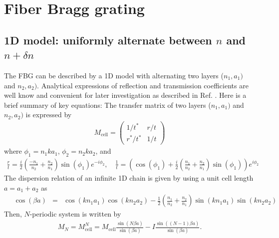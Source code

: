 \documentclass[aps,pra, onecolumn,superscriptaddress,nopacs,floatfix, showkeys, notitlepage]{revtex4-1}
\begin{document}
\newpage





\appendix

\section{Fiber Bragg grating}
\subsection{1D model: uniformly alternate between $n$ and $n+\delta n$}
The FBG can be described by a 1D model with alternating two layers ($n_1, a_1)$ and $n_2, a_2)$. 
Analytical expressions of reflection and transmission coefficients are well know and convenient for later investigation as described in Ref. \cite{Bendickson1996}.
Here is a brief summary of key equations:
The transfer matrix of two layers ($n_1, a_1)$ and $n_2, a_2)$ is expressed by
\begin{eqnarray}
    M_{\mathrm{cell}}=\left(\begin{array}{cc}
1 / t^* & r / t \\
r^* / t^* & 1 / t
\end{array}\right)
\label{eq:tmat}
\end{eqnarray}
where $\phi_1=n_1 k a_1$, $\phi_2=n_2 k a_2$, and
\begin{eqnarray}
\frac{r}{t}  =\frac{i}{2}\left(\frac{-n_1}{n_2}+\frac{n_2}{n_1}\right) \sin \left(\phi_1\right) e^{-i\phi_2}, \quad
\frac{1}{t}  =\left(\cos \left(\phi_1\right)+\frac{i}{2}\left(\frac{n_1}{n_2}+\frac{n_2}{n_1}\right) \sin \left(\phi_1\right)\right) e^{i\phi_2}
\end{eqnarray}
The dispersion relation of an infinite 1D chain is given by using a unit cell length $a=a_1+a_2$ as
\begin{eqnarray}
    \quad \cos (\beta a)&=&\cos \left(k n_1 a_1\right) \cos \left(k n_2 a_2\right)-\frac{1}{2}\left(\frac{n_1}{n_2}+\frac{n_2}{n_1}\right) \sin \left(k n_1 a_1\right) \sin \left(k n_2 a_2\right)
\end{eqnarray}
Then, $N$-periodic system is written by 
\begin{eqnarray}
    M_N=M_\mathrm{cell}^N = M_\mathrm{cell}\frac{\sin(N\beta a)}{\sin(\beta a)}-I\frac{\sin((N-1)\beta a)}{\sin(\beta a)}.
\end{eqnarray}
\end{document}
